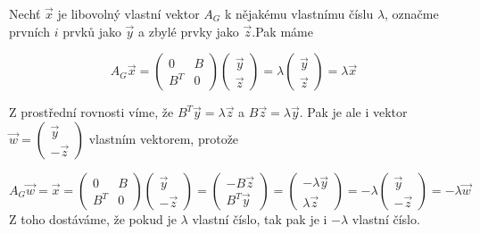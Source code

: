 \documentclass[../main.tex]{subfiles}
\begin{document}
 Nechť $\vec{x}$ je libovolný vlastní vektor $A_G$ k nějakému vlastnímu číslu $\lambda$, označme prvních $i$ prvků jako $\vec{y}$ a zbylé prvky jako $\vec{z}$.Pak máme 

 \begin{equation*}
    A_G \vec{x} = \begin{pmatrix}
        0 & B \\
        B^T & 0 
        \end{pmatrix} \begin{pmatrix}
            \vec{y}  \\
            \vec{z}  
            \end{pmatrix} = \lambda\begin{pmatrix}
                \vec{y}  \\
                \vec{z}  
                \end{pmatrix} = \lambda \vec{x}
 \end{equation*}

 Z prostřední rovnosti víme, že $B^T \vec{y} = \lambda \vec{z}$ a $B \vec{z} = \lambda \vec{y}$. Pak je ale i vektor $\vec{w}= \begin{pmatrix}
    \vec{y}  \\
     - \vec{z}  
    \end{pmatrix}$ vlastním vektorem, protože

    \begin{equation*}
        A_G \vec{w} = \vec{x} = \begin{pmatrix}
            0 & B \\
            B^T & 0 
            \end{pmatrix} \begin{pmatrix}
                \vec{y}  \\
                - \vec{z}  
                \end{pmatrix} = \begin{pmatrix}
                    -B \vec{z}  \\
                    B^T \vec{y}  
                    \end{pmatrix} = \begin{pmatrix}
                        -\lambda \vec{y}  \\
                        \lambda \vec{z}  
                        \end{pmatrix} = - \lambda \begin{pmatrix}
                             \vec{y}  \\
                            - \vec{z}  
                            \end{pmatrix} = -\lambda \vec{w}
    \end{equation*}
    Z toho dostáváme, že pokud je $\lambda$ vlastní číslo, tak pak je i $-\lambda$ vlastní číslo.
\end{document}
